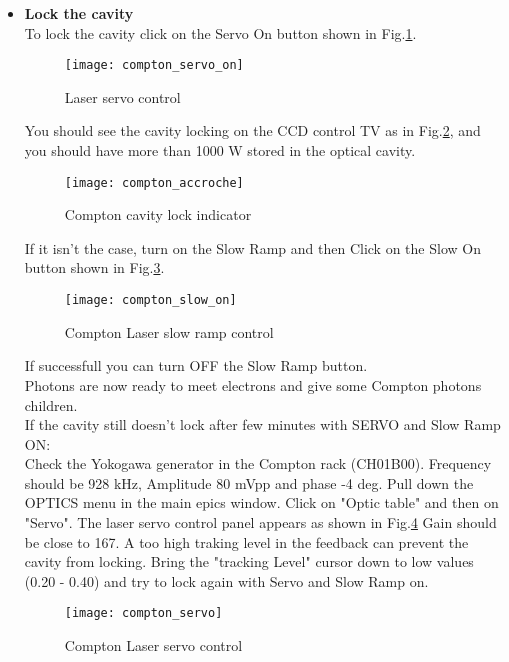 {{\begin{itemize}
\item {\bf Lock the cavity}\\
	
 To lock the cavity click on the Servo On button shown in Fig.\ref{fig:compton_servo_on}.
 \begin{figure}[htp]
    \begin{center}
        \texttt{[image: compton\_servo\_on]}
    \end{center}
    \caption[compton:servo control]{Laser servo control}
    \label{fig:compton_servo_on}
 \end{figure}
You should see the cavity locking
on the CCD control TV as in  Fig.\ref{fig:compton_accroche}, and you should have more than 1000 W stored
in the optical cavity.
\begin{figure}[htp]
    \begin{center}
        \texttt{[image: compton\_accroche]}
    \end{center}
    \caption[compton:vacity lock]{Compton cavity lock indicator}
    \label{fig:compton_accroche}
\end{figure}

If it isn't the case, turn on the Slow Ramp and then Click on the Slow On button shown in 
Fig.\ref{fig:compton_slow_on}.
\begin{figure}[htp]
    \begin{center}
        \texttt{[image: compton\_slow\_on]}
    \end{center}
    \caption[compton:laser ramp control]{Compton Laser slow ramp control}
    \label{fig:compton_slow_on}
\end{figure}

    If successfull you can turn OFF the Slow Ramp button.\\
    Photons are now ready to meet electrons and give some Compton photons children.\\

    If the cavity still doesn't lock after few minutes with SERVO and Slow Ramp ON:\\
Check the Yokogawa generator in the Compton rack (CH01B00).
Frequency should be 928 kHz, Amplitude 80 mVpp and phase -4 deg.
Pull down the OPTICS menu in the main epics window. Click on "Optic table" and then on "Servo".
The laser servo control panel appears as shown in Fig.\ref{fig:compton_servo}
Gain should be close to 167. A too high traking level in the feedback can prevent the
cavity from locking. Bring the "tracking Level" cursor down to low values (0.20 - 0.40)
and try to lock again with Servo and Slow Ramp on.
\begin{figure}[htp]
    \begin{center}
        \texttt{[image: compton\_servo]}
    \end{center}
    \caption[compton:servo settings]{Compton Laser servo control}
    \label{fig:compton_servo}
\end{figure}


\end{itemize}}}
